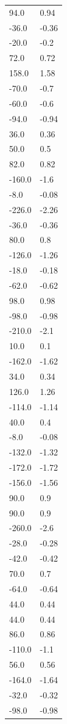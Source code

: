 \begin{longtable}{ll}
94.0 & 0.94 \\
-36.0 & -0.36 \\
-20.0 & -0.2 \\
72.0 & 0.72 \\
158.0 & 1.58 \\
-70.0 & -0.7 \\
-60.0 & -0.6 \\
-94.0 & -0.94 \\
36.0 & 0.36 \\
50.0 & 0.5 \\
82.0 & 0.82 \\
-160.0 & -1.6 \\
-8.0 & -0.08 \\
-226.0 & -2.26 \\
-36.0 & -0.36 \\
80.0 & 0.8 \\
-126.0 & -1.26 \\
-18.0 & -0.18 \\
-62.0 & -0.62 \\
98.0 & 0.98 \\
-98.0 & -0.98 \\
-210.0 & -2.1 \\
10.0 & 0.1 \\
-162.0 & -1.62 \\
34.0 & 0.34 \\
126.0 & 1.26 \\
-114.0 & -1.14 \\
40.0 & 0.4 \\
-8.0 & -0.08 \\
-132.0 & -1.32 \\
-172.0 & -1.72 \\
-156.0 & -1.56 \\
90.0 & 0.9 \\
90.0 & 0.9 \\
-260.0 & -2.6 \\
-28.0 & -0.28 \\
-42.0 & -0.42 \\
70.0 & 0.7 \\
-64.0 & -0.64 \\
44.0 & 0.44 \\
44.0 & 0.44 \\
86.0 & 0.86 \\
-110.0 & -1.1 \\
56.0 & 0.56 \\
-164.0 & -1.64 \\
-32.0 & -0.32 \\
-98.0 & -0.98 \\

\end{longtable}
